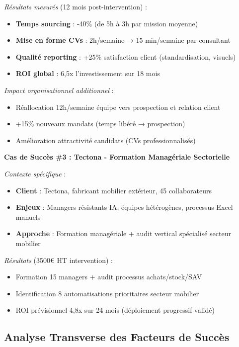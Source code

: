 \emph{Résultats mesurés} (12 mois post-intervention) :
\begin{itemize}
    \item \textbf{Temps sourcing} : -40\% (de 5h à 3h par mission moyenne)
    \item \textbf{Mise en forme CVs} : 2h/semaine → 15 min/semaine par consultant
    \item \textbf{Qualité reporting} : +25\% satisfaction client (standardisation, visuels)
    \item \textbf{ROI global} : 6,5x l'investissement sur 18 mois
\end{itemize}

\emph{Impact organisationnel additionnel} :
\begin{itemize}
    \item Réallocation 12h/semaine équipe vers prospection et relation client
    \item +15\% nouveaux mandats (temps libéré → prospection)
    \item Amélioration attractivité candidats (CVs professionnalisés)
\end{itemize}

\textbf{Cas de Succès \#3 : Tectona - Formation Managériale Sectorielle}

\emph{Contexte spécifique} \cite{luwai2025tectona} :
\begin{itemize}
    \item \textbf{Client} : Tectona, fabricant mobilier extérieur, 45 collaborateurs
    \item \textbf{Enjeux} : Managers résistants IA, équipes hétérogènes, processus Excel manuels
    \item \textbf{Approche} : Formation managériale + audit vertical spécialisé secteur mobilier
\end{itemize}

\emph{Résultats} (3500€ HT intervention) :
\begin{itemize}
    \item Formation 15 managers + audit processus achats/stock/SAV
    \item Identification 8 automatisations prioritaires secteur mobilier
    \item ROI prévisionnel 4,8x sur 24 mois (déploiement progressif validé)
\end{itemize}

\subsection{Analyse Transverse des Facteurs de Succès}

